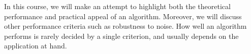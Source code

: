 In this course, we will make an attempt to highlight both the theoretical performance and practical appeal of an algorithm. Moreover, we will discuss other performance criteria such as robustness to noise. How well an algorithm performs is rarely decided by a single criterion, and usually depends on the application at hand.
